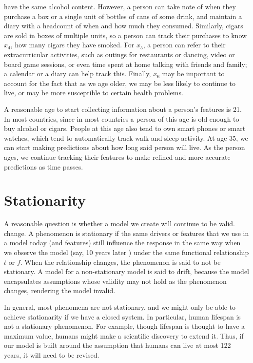 \documentclass[12pt]{article}
\begin{document}
	have the same alcohol content. However, a person can take note of when they purchase
	a box or a single unit of bottles of cans of some drink, and maintain a diary with
	a headcount of when and how much they consumed. Similarly, cigars are sold in boxes
	of multiple units, so a person can track their purchases to know $x_4$, how many 
	cigars they have smoked. For $x_5$, a person can refer to their extracurricular
	activities, such as outings for restaurants or dancing, video or board game sessions,
	or even time spent at home talking with friends and family; a calendar or
	a diary can help track this. Finally, $x_6$ may be important to account for
	the fact that as we age older, we may be less likely to continue to live,
	or may be more susceptible to certain health problems.
	
	A reasonable age to start collecting information about a person's features
	is 21. In most countries, since in most countries a person of this age is
	old enough to buy alcohol or cigars. People at this age also tend to own
	smart phones or smart watches, which tend to automatically track walk
	and sleep activity. At age 35, we can start making predictions about how
	long said person will live. As the person ages, we continue tracking
	their features to make refined and more accurate predictions as time passes.
	\section{Stationarity}
	A reasonable question is whether a model we create will continue to be valid.
	change. A phenomenon is stationary if the same drivers or features that we use in a
	model today (and features) still influence the response in the same way when we observe
	the model (say, 10 years later ) under the same functional relationship $t$ or $f$.
	When the relationship changes, the phenomenon is said to not be stationary. A
	model for a non-stationary model is said to drift, because the model encapsulates
	assumptions whose validity may not hold as the phenomenon changes, rendering
	the model invalid.
	
	In general, most phenomena are not stationary, and we might only be able to
	achieve stationarity if we have a closed system. In particular, human lifespan
	is not a stationary phenomenon. For example, though lifespan is thought to have
	a maximum value, humans might make a scientific discovery to extend it. Thus,
	if our model is built around the assumption that humans can live at most 122
	years, it will need to be revised.
\end{document}
